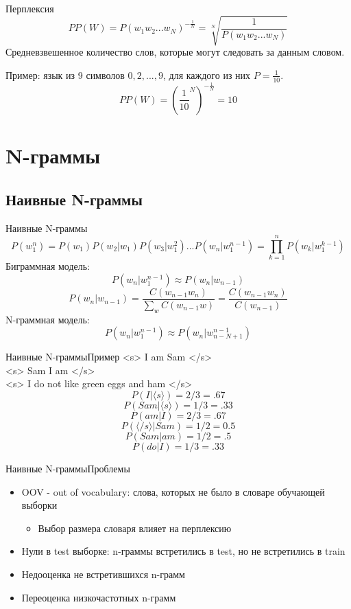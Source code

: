 \documentclass[10pt]{beamer}
\begin{document}
\begin{frame}{Перплексия}
$$ PP(W) = P(w_1w_2...w_N)^{-\frac{1}{N}} = \sqrt[N]{\frac{1}{P(w_1w_2...w_N)}} $$
Средневзвешенное количество слов, которые могут следовать за данным словом.

Пример: язык из 9 символов $0, 2, ..., 9$, для каждого из них $P = \frac{1}{10}$.
$$PP(W) = (\frac{1}{10}^N)^{-\frac{1}{N}} = 10$$
\end{frame}

\section{N-граммы}
\subsection{Наивные N-граммы}
\begin{frame}{Наивные N-граммы}
$$P(w_1^n) = P(w_1)P(w_2|w_1)P(w_3|w_1^2)...P(w_n|w_1^{n-1}) = \prod_{k=1}^{n}P(w_k|w_1^{k-1})$$
Биграммная модель:
$$P(w_n|w_1^{n-1}) \approx P(w_n|w_{n-1})$$
$$P(w_n|w_{n-1}) = \frac{C(w_{n-1}w_n)}{\sum_{w}C(w_{n-1}w)} = \frac{C(w_{n-1}w_n)}{C(w_{n-1})}$$
N-граммная модель:
$$P(w_n|w_1^{n-1}) \approx P(w_n|w_{n-N+1}^{n-1})$$
\end{frame}

\begin{frame}{Наивные N-граммы}{Пример}
<s> I am Sam </s>\\
<s> Sam I am </s>\\
<s> I do not like green eggs and ham </s>\\
$$P(I|\langle s \rangle) = 2/3 = .67 $$
$$P(Sam|\langle s \rangle) = 1/3 = .33$$
$$P(am|I) = 2/3 = .67$$
$$P(\langle /s \rangle|Sam) = 1/2 = 0.5 $$
$$P(Sam|am) = 1/2 = .5$$
$$P(do|I) = 1/3 = .33$$
\end{frame}

\begin{frame}{Наивные N-граммы}{Проблемы}
\begin{itemize}
    \item OOV - out of vocabulary: слова, которых не было в словаре обучающей выборки 
    \begin{itemize}
        \item Выбор размера словаря влияет на перплексию
    \end{itemize}
    \item Нули в test выборке: n-граммы встретились в test, но не встретились в train
    \item Недооценка не встретившихся n-грамм
    \item Переоценка низкочастотных n-грамм
\end{itemize}
\end{frame}
\end{document}
